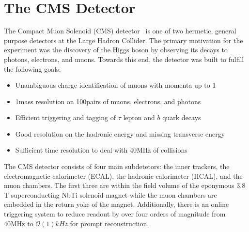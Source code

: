 \chapter{The CMS Detector}
\label{sec:cms}

The Compact Muon Solenoid (CMS) detector~\cite{CMS2008} is one of two hermetic, general purpose detectors at the Large Hadron Collider.
The primary motivation for the experiment was the discovery of the Higgs boson by observing its decays to photons, electrons, and muons.
Towards this end, the detector was built to fulfill the following goals:
\begin{itemize}
\item Unambiguous charge identification of muons with momenta up to 1\TeV
\item 1\GeV mass resolution on 100\GeV pairs of muons, electrons, and photons
\item Efficient triggering and tagging of $\tau$ lepton and $b$ quark decays
\item Good resolution on the hadronic energy and missing transverse energy
\item Sufficient time resolution to deal with 40\unit{MHz} of collisions
\end{itemize}
The CMS detector consists of four main subdetetors: the inner trackers, the electromagnetic calorimeter (ECAL), the hadronic calorimeter (HCAL), and the muon chambers.
The first three are within the field volume of the eponymous 3.8 T superconducting NbTi solenoid magnet while the muon chambers are embedded in the return yoke of the magnet.
Additionally, there is an online triggering system to reduce readout by over four orders of magnitude from 40\unit{MHz} to $\mathcal{O}(1)\unit{kHz}$ for prompt reconstruction. 
